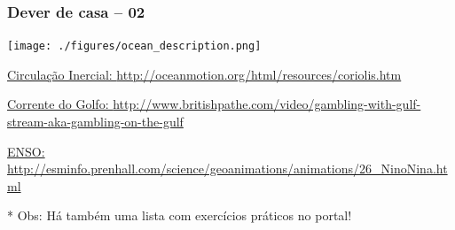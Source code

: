 \begin{frame}
  \frametitle{Dever de casa -- 02}
  \begin{center}
    \texttt{[image: ./figures/ocean\_description.png]}
  \end{center}

\scriptsize{

\href{http://oceanmotion.org/html/resources/coriolis.htm}{Circulação Inercial: \url{http://oceanmotion.org/html/resources/coriolis.htm}}

\href{http://www.britishpathe.com/video/gambling-with-gulf-stream-aka-gambling-on-the-gulf}{Corrente do Golfo: \url{http://www.britishpathe.com/video/gambling-with-gulf-stream-aka-gambling-on-the-gulf}}

\href{http://esminfo.prenhall.com/science/geoanimations/animations/26_NinoNina.html}{ENSO: \url{http://esminfo.prenhall.com/science/geoanimations/animations/26_NinoNina.html}}

}

* Obs: Há também uma lista com exercícios práticos no portal!
\end{frame}


